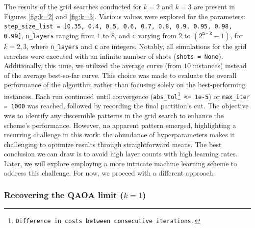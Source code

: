 The results of the grid searches conducted for $k=2$ and $k=3$ are present in Figures \ref{fig:k=2} and \ref{fig:k=3}. Various values were explored for the parameters: \texttt{step\_size\_list = [0.35, 0.4, 0.5, 0.6, 0.7, 0.8, 0.9, 0.95, 0.98, 0.99]}, \texttt{n\_layers} ranging from $1$ to $8$, and \texttt{c} varying from $2$ to $(2^{\texttt{n - k}} - 1)$, for $k=2, 3$, where \texttt{n\_layers} and \texttt{c} are integers. Notably, all simulations for the grid searches were executed with an infinite number of shots (\texttt{shots = None}). Additionally, this time, we utilized the average curve (from $10$ instances) instead of the average best-so-far curve. This choice was made to evaluate the overall performance of the algorithm rather than focusing solely on the best-performing instances. Each run continued until convergence (\texttt{abs\_tol\footnote{Difference in costs between consecutive iterations.} <= 1e-5}) or \texttt{max\_iter = 1000} was reached, followed by recording the final partition's cut. The objective was to identify any discernible patterns in the grid search to enhance the scheme's performance. However, no apparent pattern emerged, highlighting a recurring challenge in this work: the abundance of hyperparameters makes it challenging to optimize results through straightforward means. The best conclusion we can draw is to avoid high layer counts with high learning rates. Later, we will explore employing a more intricate machine learning scheme to address this challenge. For now, we proceed with a different approach.








\subsubsection*{Recovering the QAOA limit ($k = 1$)}
\label{subsubsection:QAOA-Limit_iQAQE}


